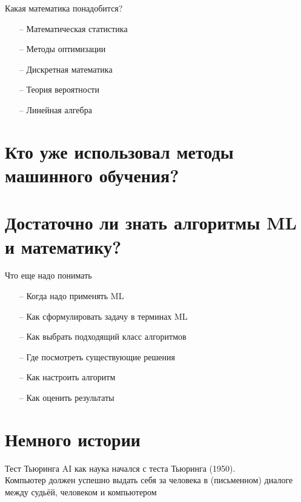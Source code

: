 \documentclass[10pt]{beamer}
\begin{document}
\begin{frame}{Какая математика понадобится?}
	\begin{itemize}
	  \item[--] Математическая статистика 
	  \item[--] Методы оптимизации 
	  \item[--] Дискретная математика
	  \item[--] Теория вероятности
	  \item[--] Линейная алгебра
	\end{itemize}
\end{frame}

\section{Кто уже использовал методы машинного обучения? }

\section{Достаточно ли знать алгоритмы ML и математику?}

\begin{frame}{Что еще надо понимать}
	\begin{itemize}
	  \item[--] Когда надо применять ML
	  \item[--] Как сформулировать задачу в терминах ML
	  \item[--] Как выбрать подходящий класс алгоритмов
	  \item[--] Где посмотреть существующие решения
	  \item[--] Как настроить алгоритм
	  \item[--] Как оценить результаты
	\end{itemize}
\end{frame}

\section{Немного истории}

\begin{frame}{Тест Тьюринга}
    AI как наука начался с теста Тьюринга (1950).\\
    \bigbreak
    Компьютер должен успешно выдать себя за человека в (письменном) диалоге между судьёй, человеком и компьютером
\end{frame}
\end{document}

